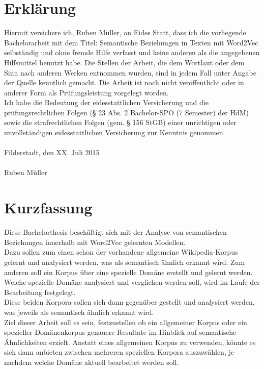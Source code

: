 \documentclass[12pt,a4paper]{report}
\begin{document}
\newpage
\chapter*{Erklärung}
Hiermit versichere ich, Ruben Müller, an Eides Statt, dass ich die vorliegende
Bachelorarbeit mit dem Titel: \glqq Semantische Beziehungen in Texten mit Word2Vec\grqq{} selbständig und ohne fremde Hilfe verfasst und keine anderen als die angegebenen
Hilfsmittel benutzt habe. Die Stellen der Arbeit, die dem Wortlaut oder dem Sinn nach anderen
Werken entnommen wurden, sind in jedem Fall unter Angabe der Quelle kenntlich gemacht. Die
Arbeit ist noch nicht veröffentlicht oder in anderer Form als Prüfungsleistung vorgelegt worden.\\
Ich habe die Bedeutung der eidesstattlichen Versicherung und die prüfungsrechtlichen Folgen (§ 23 Abs. 2 Bachelor-SPO (7 Semester) der HdM) sowie die strafrechtlichen Folgen (gem. § 156 StGB) einer unrichtigen oder
unvollständigen eidesstattlichen Versicherung zur Kenntnis genommen.\\
\vspace{1em}\\
Filderstadt, den XX. Juli 2015\\
\vspace{5em}\\
Ruben Müller


\newpage
\chapter*{Kurzfassung}
Diese Bachelorthesis beschäftigt sich mit der Analyse von semantischen Beziehungen innerhalb mit Word2Vec gelernten Modellen.
\\Dazu sollen zum einen schon der vorhandene allgemeine Wikipedia-Korpus gelernt und analysiert werden, was als semantisch ähnlich erkannt wird. Zum anderen soll ein Korpus über eine spezielle Domäne erstellt und gelernt werden. Welche spezielle Domäne analysiert und verglichen werden soll, wird im Laufe der Bearbeitung festgelegt.
\\Diese beiden Korpora sollen sich dann gegenüber gestellt und analysiert werden, was jeweils als semantisch ähnlich erkannt wird. 
\\Ziel dieser Arbeit soll es sein, festzustellen ob ein allgemeiner Korpus oder ein spezieller Domänenkorpus genauere Resultate im Hinblick auf semantische Ähnlichkeiten erzielt. Anstatt eines allgemeinen Korpus zu verwenden, könnte es sich dann anbieten zwischen mehreren speziellen Korpora auszuwählen, je nachdem welche Domäne aktuell bearbeitet werden soll.
\newpage
\end{document}
